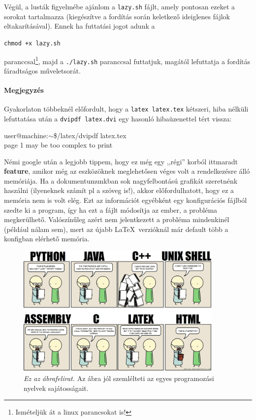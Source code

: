 \documentclass[a4paper, 12pt]{article}
\numberwithin{equation}{section}          %
\numberwithin{figure}{subsection}
\begin{document}
Végül, a lusták figyelmébe ajánlom a \texttt{lazy.sh} fájlt, amely pontosan ezeket a sorokat tartalmazza 
(kiegészítve a fordítás során keletkező ideiglenes fájlok eltakarításával). Ennek ha futtatási jogot adunk a 

\texttt{chmod +x lazy.sh}

paranccsal\footnote{Ismételjük át a linux parancsokat is!}, majd a \texttt{./lazy.sh} paranccsal futtatjuk, 
magától lefuttatja a fordítás fáradtságos műveletsorát.

\paragraph{Megjegyzés}
Gyakorlaton többeknél előfordult, hogy a \texttt{latex latex.tex} kétszeri, hiba nélküli lefuttatása után a 
\texttt{dvipdf latex.dvi} egy hasonló hibaüzenettel tért vissza: 

\noindent %
user@machine:$\sim$\$/latex/dvipdf latex.tex \\ %
page 1 may be too complex to print

Némi google után a legjobb tippem, hogy ez még egy ,,régi'' korból ittmaradt \textbf{feature}, amikor még az 
eszközöknek meglehetősen véges volt a rendelkezésre álló memóriája. Ha a dokumentumunkban sok nagyfelbontású 
grafikát szeretnénk haszálni (ilyeneknek számít pl a szöveg is!), akkor előfordulhatott, hogy ez a memória 
nem is volt elég. Ezt az információt egyébként egy konfigurációs fájlból szedte ki a program, így ha ezt a fájlt 
módosítja az ember, a probléma megkerülhető. Valószínűleg azért nem jelentkezett a probléma mindenkinél 
(például nálam sem), mert az újabb \LaTeX\ verzióknál már default több a konfigban elérhető memória.

\begin{figure}[h!]
\begin{center}
\includegraphics[width=0.9\textwidth]{./comic.jpg}
\end{center}
  \caption{\textit{Ez az ábrafelirat.} Az ábra jól szemlélteti az egyes programozási 
  nyelvek sajátosságait.}
\label{fig:abra}
\end{figure}
\end{document}
